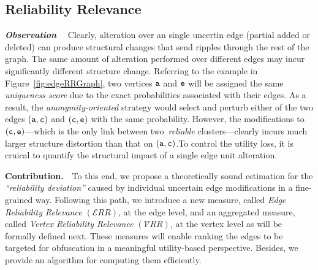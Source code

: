 \subsection{Reliability Relevance}

\textbf{\emph{Observation}}~~ 
Clearly, alteration over an single uncertin edge (partial added or deleted) can produce structural changes that send ripples through the rest of the graph. 
The same amount of alteration performed over different edges may incur significantly different structure change. 
Referring to the example in Figure~\ref{fig:edgeRRGraph}, two vertices $\tt{a}$ and $\tt{e}$ will be assigned the same {\em uniqueness score} due to the exact probabilities associated with their edges. 
As a result, the {\em anonymity-oriented} strategy would select and perturb either of the two edges $(\tt{a},\tt{c})$ and $(\tt{c},\tt{e})$ with the same probability. However, the modifications to $(\tt{c},\tt{e})$---which is the only link between two~\emph{reliable} clusters---clearly incurs much larger structure distortion than that on $(\tt{a},\tt{c})$.To control the utility loss, it is cruical to quantify the structural impact of a single edge unit alteration. 


\textbf{Contribution.}~~To this end, we propose a theoretically sound estimation for the {\em ``reliability deviation''} caused by individual uncertain edge modifications in a fine-grained way. 
Following this path, we introduce a new measure, called {\em Edge Reliability Relevance $(\mathcal{E}RR)$}, at the edge level, and an aggregated measure, called {\em Vertex Reliability Relevance} $(\mathcal{V}RR)$, at the vertex level as will be formally defined next. These measures will enable ranking the edges to be targeted for obfuscation in a meaningful utility-based perspective. Besides, we provide an algorithm for computing them efficiently. 


